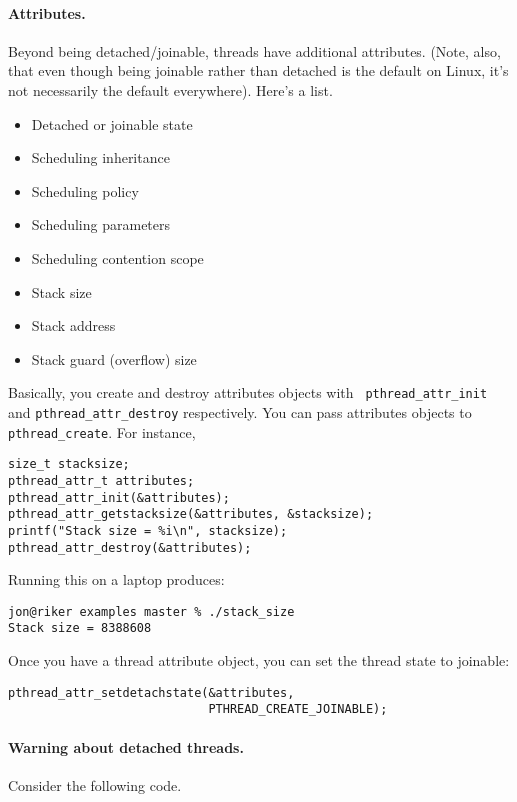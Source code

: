 \documentclass[11pt]{article}
\begin{document}
\newpage \paragraph{Attributes.} Beyond being detached/joinable, threads have additional
attributes. (Note, also, that even though being joinable rather than
detached is the default on Linux, it's not necessarily the default everywhere).
Here's a list.
  \begin{itemize}
    \item Detached or joinable state
    \item Scheduling inheritance
    \item Scheduling policy
    \item Scheduling parameters
    \item Scheduling contention scope
    \item Stack size
    \item Stack address
    \item Stack guard (overflow) size
  \end{itemize}

Basically, you create and destroy attributes objects with {\tt
  pthread\_attr\_init} and {\tt pthread\_attr\_destroy}
respectively. You can pass attributes objects to {\tt
  pthread\_create}. For instance,

  \begin{lstlisting}
size_t stacksize;
pthread_attr_t attributes;
pthread_attr_init(&attributes);
pthread_attr_getstacksize(&attributes, &stacksize);
printf("Stack size = %i\n", stacksize);
pthread_attr_destroy(&attributes);
  \end{lstlisting}

Running this on a laptop produces:

  \begin{lstlisting}
jon@riker examples master % ./stack_size 
Stack size = 8388608
  \end{lstlisting}

Once you have a thread attribute object, you can set the thread state to joinable:
  \begin{lstlisting}
pthread_attr_setdetachstate(&attributes,
                            PTHREAD_CREATE_JOINABLE);
  \end{lstlisting}

\paragraph{Warning about detached threads.} Consider the following code.
\end{document}
